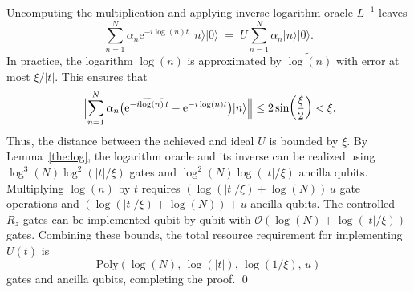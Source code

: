 \documentclass[aps,pra,twocolumn,superscriptaddress,preprintnumbers,amsmath,amssymb]{revtex4-2}
\begin{document}
Uncomputing the multiplication and applying inverse logarithm oracle $L^{-1}$ leaves
\begin{equation}
    \sum_{n=1}^{N} \alpha_n \mathrm{e}^{-i\log(n)t}\,|n\rangle |0\rangle \;=\; U \sum_{n=1}^{N} \alpha_n |n\rangle |0\rangle.
\end{equation}
In practice, the logarithm $\log(n)$ is approximated by $\widetilde{\log(n)}$ with error at most $\xi/|t|$. This  ensures that
\begin{equation}
   \Bigl\| \sum_{n=1}^{N} \alpha_n \bigl(\mathrm{e}^{-i\widetilde{\log(n)}\,t} - \mathrm{e}^{-i\log(n)t}\bigr)|n\rangle \Bigr\|
   \leq 2\sin\!\left(\frac{\xi}{2}\right)
   <\xi.
\end{equation}
Thus, the distance between the achieved and ideal $U$ is bounded by $\xi$. By Lemma~\ref{the:log}, the logarithm oracle and its inverse can be realized using $\log^3(N)\log^2(|t|/\xi)$ gates and $\log^2(N)\log(|t|/\xi)$ ancilla qubits.  
Multiplying $\log(n)$ by $t$ requires $(\log(|t|/\xi)+\log(N))\,u$ gate operations and $(\log(|t|/\xi)+\log(N))+u$ ancilla qubits.  
The controlled $R_z$ gates can be implemented qubit by qubit with $\mathcal{O}(\log(N)+\log(|t|/\xi))$ gates. Combining these bounds, the total resource requirement for implementing $U(t)$ is
\begin{equation}
    \mathrm{Poly}\!\left(\log(N),\,\log(|t|),\,\log(1/\xi),\,u\right)
\end{equation}
gates and ancilla qubits, completing the proof. \qed
\end{document}
